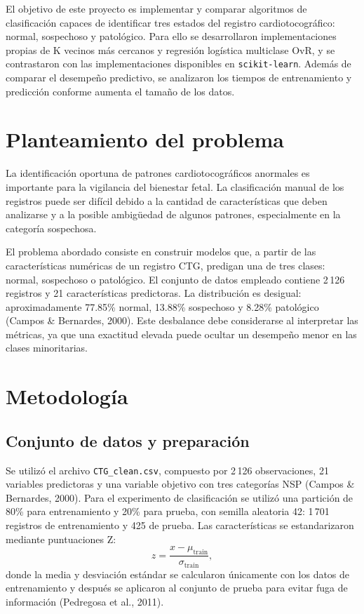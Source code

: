 \documentclass[10pt,a4paper,twocolumn]{article}
\begin{document}
El objetivo de este proyecto es implementar y comparar algoritmos de clasificación capaces de identificar tres estados del registro cardiotocográfico: normal, sospechoso y patológico. Para ello se desarrollaron implementaciones propias de K vecinos más cercanos y regresión logística multiclase OvR, y se contrastaron con las implementaciones disponibles en \texttt{scikit-learn}. Además de comparar el desempeño predictivo, se analizaron los tiempos de entrenamiento y predicción conforme aumenta el tamaño de los datos.

\section{Planteamiento del problema}
La identificación oportuna de patrones cardiotocográficos anormales es importante para la vigilancia del bienestar fetal. La clasificación manual de los registros puede ser difícil debido a la cantidad de características que deben analizarse y a la posible ambigüedad de algunos patrones, especialmente en la categoría sospechosa.

El problema abordado consiste en construir modelos que, a partir de las características numéricas de un registro CTG, predigan una de tres clases: normal, sospechoso o patológico. El conjunto de datos empleado contiene 2\,126 registros y 21 características predictoras. La distribución es desigual: aproximadamente 77.85\% normal, 13.88\% sospechoso y 8.28\% patológico (Campos \& Bernardes, 2000). Este desbalance debe considerarse al interpretar las métricas, ya que una exactitud elevada puede ocultar un desempeño menor en las clases minoritarias.

\section{Metodología}
\subsection{Conjunto de datos y preparación}
Se utilizó el archivo \texttt{CTG\_clean.csv}, compuesto por 2\,126 observaciones, 21 variables predictoras y una variable objetivo con tres categorías NSP (Campos \& Bernardes, 2000). Para el experimento de clasificación se utilizó una partición de 80\% para entrenamiento y 20\% para prueba, con semilla aleatoria 42: 1\,701 registros de entrenamiento y 425 de prueba. Las características se estandarizaron mediante puntuaciones Z:
\[
z = \frac{x-\mu_{\mathrm{train}}}{\sigma_{\mathrm{train}}},
\]
donde la media y desviación estándar se calcularon únicamente con los datos de entrenamiento y después se aplicaron al conjunto de prueba para evitar fuga de información (Pedregosa et al., 2011).
\end{document}
